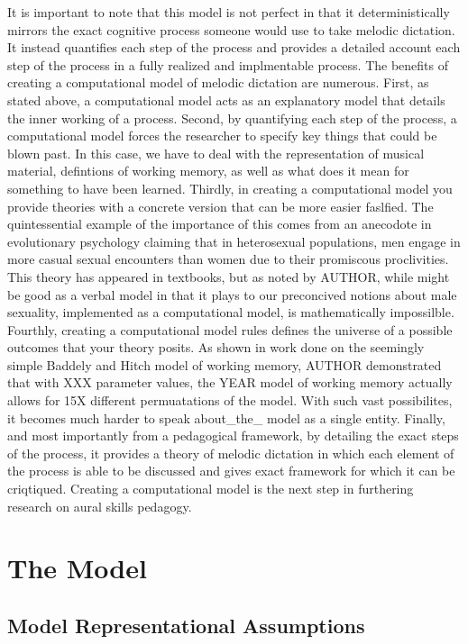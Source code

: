 \documentclass[]{book}
\theoremstyle{definition}
\theoremstyle{definition}
\theoremstyle{definition}
\theoremstyle{remark}
\begin{document}
It is important to note that this model is not perfect in that it
deterministically mirrors the exact cognitive process someone would use
to take melodic dictation. It instead quantifies each step of the
process and provides a detailed account each step of the process in a
fully realized and implmentable process. The benefits of creating a
computational model of melodic dictation are numerous. First, as stated
above, a computational model acts as an explanatory model that details
the inner working of a process. Second, by quantifying each step of the
process, a computational model forces the researcher to specify key
things that could be blown past. In this case, we have to deal with the
representation of musical material, defintions of working memory, as
well as what does it mean for something to have been learned. Thirdly,
in creating a computational model you provide theories with a concrete
version that can be more easier faslfied. The quintessential example of
the importance of this comes from an anecodote in evolutionary
psychology claiming that in heterosexual populations, men engage in more
casual sexual encounters than women due to their promiscous
proclivities. This theory has appeared in textbooks, but as noted by
AUTHOR, while might be good as a verbal model in that it plays to our
preconcived notions about male sexuality, implemented as a computational
model, is mathematically impossilble. Fourthly, creating a computational
model rules defines the universe of a possible outcomes that your theory
posits. As shown in work done on the seemingly simple Baddely and Hitch
model of working memory, AUTHOR demonstrated that with XXX parameter
values, the YEAR model of working memory actually allows for 15X
different permuatations of the model. With such vast possibilites, it
becomes much harder to speak about\_the\_ model as a single entity.
Finally, and most importantly from a pedagogical framework, by detailing
the exact steps of the process, it provides a theory of melodic
dictation in which each element of the process is able to be discussed
and gives exact framework for which it can be criqtiqued. Creating a
computational model is the next step in furthering research on aural
skills pedagogy.

\hypertarget{the-model}{%
\section{The Model}\label{the-model}}

\hypertarget{model-representational-assumptions}{%
\subsection{Model Representational
Assumptions}\label{model-representational-assumptions}}
\end{document}
